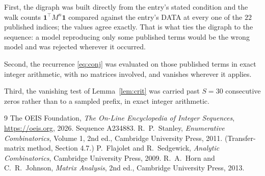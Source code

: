 \documentclass[11pt,a4paper]{article}
\theoremstyle{plain}
\theoremstyle{definition}
\begin{document}
First, the digraph was built directly from the entry's stated condition and the walk counts
$\mathbf{1}^{\!\top}M^{n}\mathbf{1}$ compared against the entry's DATA at every one of
the $22$ published indices; the values agree exactly. That is what ties the digraph to
the sequence: a model reproducing only some published terms would be the wrong model and
was rejected wherever it occurred.

Second, the recurrence \eqref{eq:conj} was evaluated on those published terms in exact
integer arithmetic, with no matrices involved, and vanishes wherever it applies.

Third, the vanishing test of Lemma~\ref{lem:crit} was carried past $S=30$ consecutive
zeros rather than to a sampled prefix, in exact integer arithmetic.

\begin{thebibliography}{9}
 The OEIS Foundation, \emph{The On-Line Encyclopedia of Integer
Sequences}, \url{https://oeis.org}, 2026. Sequence A234883.
 R.~P.~Stanley, \emph{Enumerative Combinatorics}, Volume 1, 2nd ed.,
Cambridge University Press, 2011. (Transfer-matrix method, Section 4.7.)
 P.~Flajolet and R.~Sedgewick, \emph{Analytic Combinatorics}, Cambridge
University Press, 2009.
 R.~A.~Horn and C.~R.~Johnson, \emph{Matrix Analysis}, 2nd ed., Cambridge
University Press, 2013.
\end{thebibliography}
\end{document}
